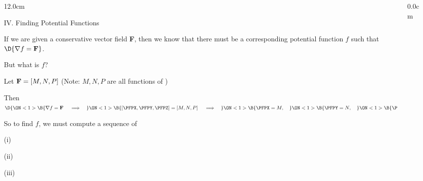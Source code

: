 \begin{frame}
\begin{columns}\begin{column}{12.0cm}

{IV. Finding Potential Functions}

\vspace{0.3cm}

\scriptsize
If we are given a conservative vector field {\bf F}, then we know that there must be a corresponding potential function $f$ such that $\D{{\nabla f = {\bf F}}}$.

\vspace{0.4cm}

But what is $f$?

\vspace{0.5cm}

Let ${\bf F} = [M,N,P]$ \qquad (Note: $M, N, P$ are all functions of 
)

\vspace{0.5cm}

Then
$\D{ 
\ON<1>{\B{\nabla f = {\bf F} \quad \implies \quad}}
\ON<1>{\B{\left[\PFPX,\PFPY,\PFPZ\right] = [M,N,P] \quad \implies \quad}}
\ON<1>{\B{\PFPX = M, \quad}}
\ON<1>{\B{\PFPY = N, \quad}}
\ON<1>{\B{\PFPZ = P}}
}$ 

\vspace{0.5cm}

So to find $f$, we must compute a sequence of 

\vspace{0.5cm}

(i) 

\vspace{0.3cm}

(ii) 

\vspace{0.3cm}

(iii)

\vspace{1.2cm}

\end{column}\begin{column}{0.0cm}\end{column}\end{columns}
\end{frame}

